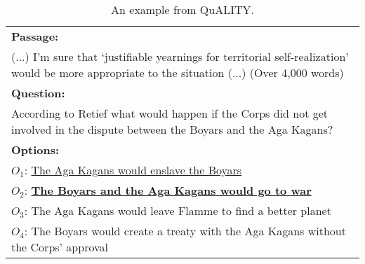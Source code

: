 \begin{table}\small
    \centering
    \begin{tabular}{p{340pt}}
    \hline
    {\bfseries Passage:} \\
    (...) I'm sure that `justifiable yearnings for territorial self-realization' would be more appropriate to the situation (...) (Over 4,000 words) \\
    \hline
    {\bfseries Question:} \\
    According to Retief what would happen if the Corps did not get involved in the dispute between the Boyars and the Aga Kagans? \\
    \hline
    {\bfseries Options:} \\
    $O_1$: \underline{The Aga Kagans would enslave the Boyars} \\
    $O_2$: \underline{\textbf{The Boyars and the Aga Kagans would go to war}} \\
    $O_3$: The Aga Kagans would leave Flamme to find a better planet \\
    \textbf{$O_4$}: The Boyars would create a treaty with the Aga Kagans without the Corps' approval \\
    \hline
    \end{tabular}
    \caption{\label{4-1}
    An example from QuALITY. %
    }
\end{table}
